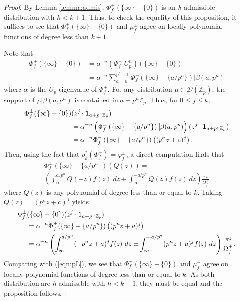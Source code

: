 \documentclass{amsart}
\theoremstyle{plain}
\theoremstyle{definition}
\newcommand{\D}{{\mathcal D}}
\newcommand{\Z}{{\mathbb Z}}
\newcommand{\Zp}{\Z_p}
\newcommand{\bapn}{\beta(a,p^n)}
\renewcommand{\sp}{{\rho^*_k}}
\newcommand{\Dla}{\D(\Zp)}
\begin{document}
\begin{proof}
By Lemma \ref{lemma:admis}, $\Phi^\pm_f(\{\infty\} - \{0 \})$ is an $h$-admissible distribution with $h<k+1$.  Thus, to check the equality of this proposition, it suffices to see that $\Phi^\pm_f(\{\infty\} - \{0 \})$ and $\mu^\pm_f$ agree on locally polynomial functions of degree less than $k+1$.

Note that 
\begin{align*}
\Phi^\pm_f(\{\infty\} - \{ 0\}) &= \alpha^{-n} (\Phi^\pm_f | U_p^n)(\{\infty\} - \{0\}) \\
&= \alpha^{-n} \sum_{a=0}^{p^n-1} \Phi^\pm_f\left( \{\infty\} -
\{a/p^n\} \right) \big| \bapn
\end{align*}
where $\alpha$ is the $U_p$-eigenvalue of $\Phi_f^\pm$.
For any distribution $\mu \in \Dla$, the support of $\mu \big|
\bapn$ is contained in $a+p^n\Zp$.  Thus, for $0 \leq j \leq k$, 
\begin{align*}
\Phi^\pm_f(\{\infty\} - \{0\})&(z^j \cdot {\bf 1}_{a + p^n\Zp})  \\
&= \alpha^{-n} \left( \Phi^\pm_f\left(\{\infty\} - \{a/p^n\} \right) \big| \bapn \right)(z^j \cdot {\bf 1}_{a + p^n\Zp}) \\
&= \alpha^{-n} \Phi^\pm_f\left( \{\infty\} - \{a/p^n\} \right)\left((p^nz+a)^j\right). 
\end{align*}
Then, using the fact that $\sp(\Phi^\pm_f) = \varphi^\pm_f$, a direct computation finds that 
\begin{multline*}
\Phi^\pm_f(\{\infty\} - \{a/p^n\})\left(Q(z)\right) =\\
\left( 
\int_\infty^{a/p^n} Q(-z) f(z) ~dz
\pm 
\int_\infty^{-a/p^n} Q(z) f(z) ~dz
\right)
\frac{\pi i}{\Omega^\pm_f}  
\end{multline*}
where $Q(z)$ is any polynomial of degree less than or equal to $k$.
Taking $Q(z) = (p^nz+a)^j$ yields
\begin{align*}
\Phi^\pm_f&(\{\infty\} - \{0\})(z^j \cdot {\bf 1}_{a + p^n\Zp})  \\
&= \alpha^{-n} \Phi^\pm_f(\{\infty\} - \{a/p^n\}) \left( (p^nz+a)^j \right) \\
&= 
\alpha^{-n} 
\left(
\int_\infty^{a/p^n} (-p^nz+a)^j f(z) ~dz
\pm 
\int_\infty^{-a/p^n} (p^nz+a)^j f(z) ~dz
\right) \frac{\pi i}{\Omega^\pm_f}.
\end{align*}
Comparing with (\ref{eqn:pL}), we see that $\Phi^\pm_f(\{\infty\} - \{0\})$ and $\mu^\pm_f$ agree on locally polynomial functions of degree less than or equal to $k$.  As both distribution are $h$-admissible with $h < k+1$, they must be equal and the proposition follows.
\end{proof}
\end{document}
